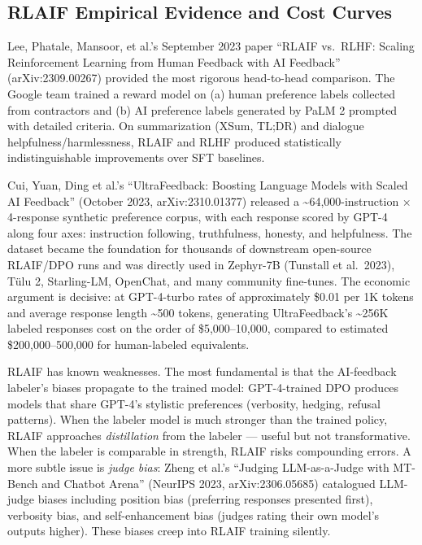 \subsection{RLAIF Empirical Evidence and Cost Curves}\label{rlaif-empirical-evidence-and-cost-curves}

Lee, Phatale, Mansoor, et al.'s September 2023 paper ``RLAIF vs.~RLHF: Scaling Reinforcement Learning from Human Feedback with AI Feedback'' (arXiv:2309.00267) provided the most rigorous head-to-head comparison. The Google team trained a reward model on (a) human preference labels collected from contractors and (b) AI preference labels generated by PaLM 2 prompted with detailed criteria. On summarization (XSum, TL;DR) and dialogue helpfulness/harmlessness, RLAIF and RLHF produced statistically indistinguishable improvements over SFT baselines.

Cui, Yuan, Ding et al.'s ``UltraFeedback: Boosting Language Models with Scaled AI Feedback'' (October 2023, arXiv:2310.01377) released a \textasciitilde64,000-instruction × 4-response synthetic preference corpus, with each response scored by GPT-4 along four axes: instruction following, truthfulness, honesty, and helpfulness. The dataset became the foundation for thousands of downstream open-source RLAIF/DPO runs and was directly used in Zephyr-7B (Tunstall et al.~2023), Tülu 2, Starling-LM, OpenChat, and many community fine-tunes. The economic argument is decisive: at GPT-4-turbo rates of approximately \$0.01 per 1K tokens and average response length \textasciitilde500 tokens, generating UltraFeedback's \textasciitilde256K labeled responses cost on the order of \$5,000--10,000, compared to estimated \$200,000--500,000 for human-labeled equivalents.

RLAIF has known weaknesses. The most fundamental is that the AI-feedback labeler's biases propagate to the trained model: GPT-4-trained DPO produces models that share GPT-4's stylistic preferences (verbosity, hedging, refusal patterns). When the labeler model is much stronger than the trained policy, RLAIF approaches \emph{distillation} from the labeler --- useful but not transformative. When the labeler is comparable in strength, RLAIF risks compounding errors. A more subtle issue is \emph{judge bias}: Zheng et al.'s ``Judging LLM-as-a-Judge with MT-Bench and Chatbot Arena'' (NeurIPS 2023, arXiv:2306.05685) catalogued LLM-judge biases including position bias (preferring responses presented first), verbosity bias, and self-enhancement bias (judges rating their own model's outputs higher). These biases creep into RLAIF training silently.

